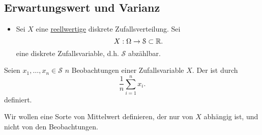 \subsection{Erwartungswert und Varianz}
\begin{itemize}
    \item Sei $X$ eine  \underline{reellwertige} diskrete Zufallsverteilung. Sei 
        \[
        X : \Omega \to  \mathcal{S}\subset \mathbb{R}
        .\] 
        eine diskrete Zufallsvariable, d.h. $\mathcal{S}$ abzählbar.
\end{itemize}
\begin{definition}\label{def:empirischer-mittelwert}
    Seien $x_1,\ldots,x_n\in \mathcal{S}$ $n$ Beobachtungen einer Zufallsvariable $X$. Der  ist durch
    \[
    \frac{1}{n}\sum_{i=1}^n x_i
    .\] 
    definiert.
\end{definition}
\begin{goal}
    Wir wollen eine Sorte von Mittelwert definieren, der nur von $X$ abhängig ist, und nicht von den Beobachtungen.
\end{goal}

